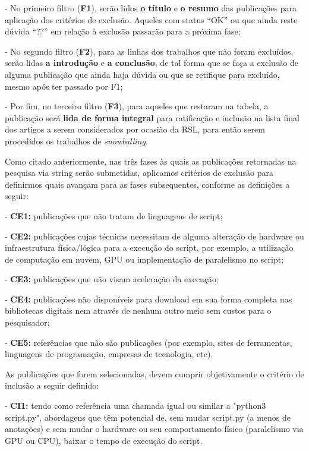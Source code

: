 \documentclass[sigconf]{acmart}
\begin{document}
- No primeiro filtro (\textbf{F1}), serão lidos \textbf{o título} e \textbf {o resumo} das publicações para aplicação dos critérios de exclusão. Aqueles com status “OK” ou que ainda reste dúvida “??” em relação à exclusão passarão para a próxima fase;

- No segundo filtro (\textbf{F2}), para as linhas dos trabalhos que não foram excluídos, serão lidas \textbf{a introdução} e \textbf{a conclusão}, de tal forma que se faça a exclusão de alguma publicação que ainda haja dúvida ou que se retifique para excluído, mesmo após ter passado por F1;

- Por fim, no terceiro filtro (\textbf{F3}), para aqueles que restaram na tabela, a publicação será \textbf{lida de forma integral} para ratificação e inclusão na lista final dos artigos a serem considerados por ocasião da RSL, para então serem procedidos os trabalhos de \textit{snowballing}.

Como citado anteriormente, nas três fases às quais as publicações retornadas na pesquisa via string serão submetidas, aplicamos critérios de exclusão para definirmos quais avançam para as fases subsequentes, conforme as definições a seguir:

- \textbf{CE1:} publicações que não tratam de linguagens de script;

- \textbf{CE2:} publicações cujas técnicas necessitam de alguma alteração de hardware ou infraestrutura física/lógica para a execução do script, por exemplo, a utilização de computação em nuvem, GPU ou implementação de paralelismo no script;

- \textbf{CE3:} publicações que não visam aceleração da execução;

- \textbf{CE4:} publicações não disponíveis para download em sua forma completa nas bibliotecas digitais nem através de nenhum outro meio sem custos para o pesquisador;

- \textbf{CE5:} referências que não são publicações (por exemplo, sites de ferramentas, linguagens de programação, empresas de tecnologia, etc).

As publicações que forem selecionadas, devem cumprir objetivamente o critério de inclusão a seguir definido:

- \textbf{CI1:} tendo como referência uma chamada igual ou similar a "python3 script.py", abordagens que têm potencial de, sem mudar script.py (a menos de anotações) e sem mudar o hardware ou seu comportamento físico (paralelismo via GPU ou CPU), baixar o tempo de execução do script.
\end{document}
